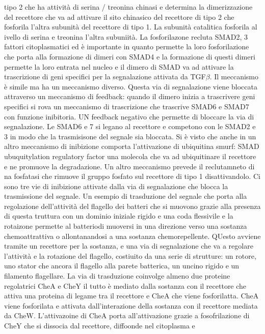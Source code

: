 tipo 2 che ha attivit\`a di serina / treonina chinasi e determina la dimerizzazione del recettore che va ad attivare il sito chinasico del recettore di tipo 2 che fosforila l'altra 
subunit\`a del recettore di tipo 1. La subunit\`a catalitica fosforila al ivello di serina e treonina l'altra subuniit\`a. La fosforilazone recluta SMAD2, 3 fattori citoplasmatici ed
\`e importante in quanto permette la loro fosforilazione che porta alla formazione di dimeri con SMAD4 e la formazione di questi dimeri permette la loro entrata nel nucleo e il dimero di 
SMAD va ad attivare la trascrizione di geni specifici per la segnalazione attivata da TGF$\beta$. Il meccanismo \`e simile ma ha un meccanismo diverso. Questa via di segnalazione viene
bloccata attraverso un meccanismo di feedback: quando il dimero inizia a trascrivere geni specifici si rova un meccanismo di trascrizione che trascrive SMAD6 e SMAD7 con funzione 
inibitoria. UN feedback negativo che permette di bloccare la via di segnalazione. Le SMAD6 e 7 si legano al recettore e competono con le SMAD2 e 3 in modo che la trasmisisone del 
segnale sia bloccata. Si \`e visto che anche in un altro meccanismo di inibizione comporta l'attivazione di ubiquitina smurf: SMAD ubuquitylation regulatory factor una molecola che 
va ad ubiquitinare il recettore e ne promuove la degradazione. Un altro meccanismo prevede il reclutamneto di na fosfatasi che rimuove il gruppo fosfato sul recettore di tipo 1 
disattivandolo. Ci sono tre vie di inibizione attivate dalla via di segnalazione che blocca la trasmissione del segnale. 
Un esempio di trasduzione del segnale che porta alla regolazione dell'attivit\`a del flagello dei batteri che si muovono grazie alla presenza di questa truttura con un dominio iniziale
rigido e una coda flessivile e la rotaizone permette al batteriodi muoversi in una direzione verso una sostanza chemoattrattiva o allontanandosi a una sostanza chemorepellente. QUesto
avviene tramite un recettore per la sostanza, e una via di segnalazione che va a regolare l'attivit\`a e la rotazione del flagello, costiuito da una serie di strutture: un rotore, 
uno stator che ancora il flagello alla parete batterica, un uncino rigido e un filamento flagellare. La via di trasduzione coinvolge almeno due proteine regolatrici CheA e CheY il 
tutto \`e mediato dalla sostanza con il recettore che attiva una proteina di legame tra il recettore e CheA che viene fosforilatta. CheA viene fosforilata e attivata dall'interazione
della sostanza con il recettore mediata da CheW. L'attivazoine di CheA porta all'attivazione grazie a fosofrilazione di CheY che si dissocia dal recettore, diffoonde nel citoplasma e 
